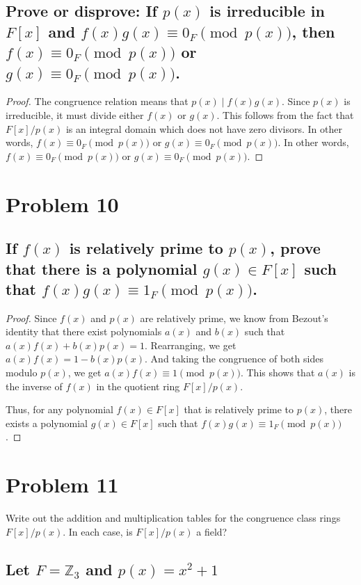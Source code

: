\documentclass{article}
\begin{document}
\subsection{Prove or disprove: If $p(x)$ is irreducible in $F[x]$ and $f(x)g(x) \equiv 0_F \pmod{p(x)}$, then $f(x) \equiv 0_F \pmod{p(x)}$ or $g(x) \equiv 0_F \pmod{p(x)}$.}

\begin{proof}
The congruence relation means that $p(x) \mid f(x)g(x)$. Since $p(x)$ is irreducible, it must divide either $f(x)$ or $g(x)$. This follows from
    the fact that $F[x]/p(x)$ is an integral domain which does not have zero divisors.
In other words, $f(x) \equiv 0_F \pmod{p(x)}$ or $g(x) \equiv 0_F \pmod{p(x)}$.
    In other words, $f(x) \equiv 0_F \pmod{p(x)}$ or $g(x) \equiv 0_F \pmod{p(x)}$.
\end{proof}



\section{Problem 10}
\subsection{If $f(x)$ is relatively prime to $p(x)$, prove that there is a polynomial $g(x) \in F[x]$ such that $f(x)g(x) \equiv 1_F \pmod{p(x)}$.}

\begin{proof}
Since $f(x)$ and $p(x)$ are relatively prime, we know from Bezout's identity that there exist polynomials $a(x)$ and $b(x)$ such that $a(x)f(x) + b(x)p(x) = 1$.
Rearranging, we get $a(x)f(x) = 1 - b(x)p(x)$. And taking the congruence of both sides modulo $p(x)$, we get $a(x)f(x) \equiv 1 \pmod{p(x)}$.
This shows that $a(x)$ is the inverse of $f(x)$ in the quotient ring $F[x] / p(x)$.

Thus, for any polynomial $f(x) \in F[x]$ that is relatively prime to $p(x)$, there exists a polynomial $g(x) \in F[x]$ such that $f(x)g(x) \equiv 1_F \pmod{p(x)}$.
\end{proof}


\section{Problem 11}
Write out the addition and multiplication tables for the congruence class rings $F[x]/p(x)$. In each case, is $F[x]/p(x)$ a field?

\subsection{Let $F = \mathbb{Z}_3$ and $p(x) = x^2 + 1$}
\end{document}
